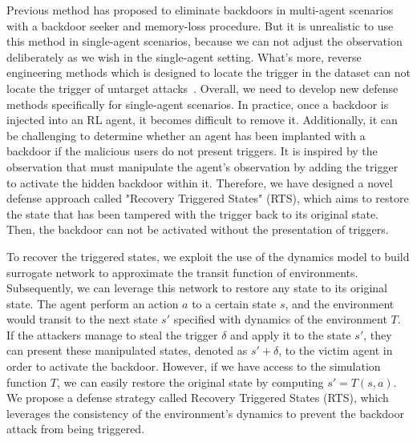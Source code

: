 \documentclass[letterpaper, 10 pt, conference]{ieeeconf}  %
\begin{document}
Previous method has proposed to eliminate backdoors in multi-agent scenarios~\cite{trojanSeeker} with a backdoor seeker and memory-loss procedure. But it is unrealistic to use this method in single-agent scenarios, because we can not adjust the observation deliberately as we wish in the single-agent setting. What's more, reverse engineering methods which is designed to locate the trigger in the dataset can not locate the trigger of untarget attacks~\cite{neuralcleanse,trojdrl}. Overall, we need to develop new defense methods specifically for single-agent scenarios. In practice, once a backdoor is injected into an RL agent, it becomes difficult to remove it. Additionally, it can be challenging to determine whether an agent has been implanted with a backdoor if the malicious users do not present triggers. It is inspired by the observation that must manipulate the agent's observation by adding the trigger to activate the hidden backdoor within it. 
Therefore, we have designed a novel defense approach called "Recovery Triggered States" (RTS), which aims to restore the state that has been tampered with the trigger back to its original state. Then, the backdoor can not be activated without the presentation of triggers.

To recover the triggered states, we exploit the use of the dynamics model to build surrogate network to approximate the transit function of environments. Subsequently, we can leverage this network to restore any state to its original state. The agent perform an action $a$ to a certain state $s$, and the environment would transit to the next state $s'$ specified with dynamics of the environment $T$. If the attackers manage to steal the trigger $\delta$ and apply it to the state $s'$, they can present these manipulated states, denoted as $s' + \delta$, to the victim agent in order to activate the backdoor. However, if we have access to the simulation function $T$, we can easily restore the original state by computing $s' = T(s,a)$.  We propose a defense strategy called Recovery Triggered States (RTS), which leverages the consistency of the environment's dynamics to prevent the backdoor attack from being triggered.
\end{document}
